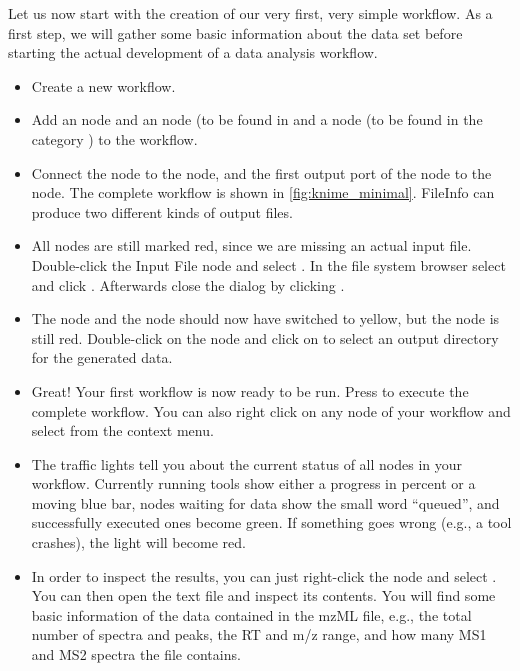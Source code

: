 Let us now start with the creation of our very first, very simple workflow.
As a first step, we will gather some basic information about the data set before starting the
actual development of a data analysis workflow.

\begin{itemize}
\item
Create a new workflow.
\item Add an  node and an  node (to be found in  and a  node (to be found in the category ) to the workflow.
\item Connect the  node to the  node, and the first output port of the  node to the  node.
The complete workflow is shown in \cref{fig:knime_minimal}.
FileInfo can produce two different kinds of output files.
\item All nodes are still marked red, since we are missing an actual input file.
Double-click the Input File node and select .
In the file system browser select  and click .
Afterwards close the dialog by clicking .
\item The  node and the  node should now have switched to yellow, but the  node is still red.
Double-click on the  node and click on  to select an output directory for the generated data.
\item Great! Your first workflow is now ready to be run. Press  to execute the complete workflow.
You can also right click on any node of your workflow and select  from the context menu.
\item The traffic lights tell you about the current status of all nodes in your workflow.
Currently running tools show either a progress in percent or a moving blue bar, nodes waiting for data show the small word ``queued'', and successfully executed ones become green.
If something goes wrong (e.g., a tool crashes), the light will become red.
\item In order to inspect the results, you can just right-click the  node and select .
You can then open the text file and inspect its contents.
You will find some basic information of the data contained in the mzML file, e.g., the total number of spectra and peaks, the RT and m/z range, and how many MS1 and MS2 spectra the file contains.
\end{itemize}

